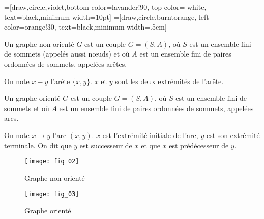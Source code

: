 
\def\lav{lavander!90}
\def\oran{orange!30}

=[draw,circle,violet,bottom color=\lav,
                  top color= white, text=black,minimum width=10pt]
=[draw,circle,burntorange, left color=\oran,
                       text=black,minimum width=.5cm]

                        
% 
% 
%  
%
%
%


\begin{defi}
Un graphe non orienté $G$ est un couple $G=(S,A)$, où $S$ est un ensemble fini de sommets (appelés aussi n\oe uds)  et où $A$ est un ensemble fini de paires ordonnées de sommets, appelées arêtes.

On note $x - y$ l'arête $\{x,y\}$. $x$ et $y$ sont les deux extrémités de l'arête.
\end{defi}

\begin{defi}\cite{ref_01}
Un graphe orienté $G$ est un couple $G=(S,A)$, où $S$ est un ensemble fini de sommets et où $A$ est un ensemble fini de paires ordonnées de sommets, appelées arcs.

On note $x\to y$ l'arc $(x,y)$. $x$ est l'extrémité initiale de l'arc, $y$ est son extrémité terminale. On dit que $y$ est successeur de $x$ et que $x$ est prédécesseur de $y$. 
\end{defi}




\begin{multicols}{2}
\begin{figure}[H]
\texttt{[image: fig\_02]}
\captionsetup{justification=centering}
\caption{Graphe non orienté \label{fig_02}}
\end{figure}

\begin{figure}[H]
\texttt{[image: fig\_03]}
\captionsetup{justification=centering}
\caption{Graphe orienté}
\end{figure}
\end{multicols}


